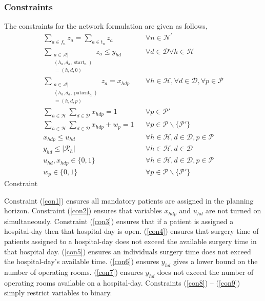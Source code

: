     \subsubsection*{Constraints} The constraints for the network formulation are given as follows,
    \begin{align}
        \sum\limits_{a \in f_n} z_a = \sum\limits_{a \in t_n} z_a 
            && \forall n \in \mathcal{N}^\prime \label{NETcon1:room_flow}\\
        \sum\limits_{\substack{a \in \mathcal{A} | \\ (h_a, d_a, \operatorname{start}_a) \\= (h,d,0)}}z_a \leq y_{hd}
            && \forall d \in \mathcal{D} \forall h \in \mathcal{H}\label{NETcon2:restrict_ops_by_ors}\\
        \sum\limits_{\substack{a \in \mathcal{A} |\\ (h_a,d_a,\operatorname{patient}_a)\\ =(h,d,p)}}z_a= x_{hdp}
            && \forall h \in \mathcal{H}, \forall d \in \mathcal{D}, \forall p \in \mathcal{P}  \label{NETcon3:is_patient_operated_on} \\
        \sum\limits_{h \in \mathcal{H}} \sum\limits_{d \in \mathcal{D}}x_{hdp} = 1 
            && \forall p \in \mathcal{P}' \label{NETcon4:must_do_mandatory}\\
        \sum\limits_{h \in \mathcal{H}} \sum\limits_{d \in \mathcal{D}} x_{hdp} + w_p = 1
            && \forall p \in \mathcal{P} \backslash \{\mathcal{P}'\}\label{NETcon5:turn_on_w}\\
        x_{hdp} \leq u_{hd}
            && \forall h \in \mathcal{H}, d \in \mathcal{D}, p \in \mathcal{P}\label{NETcon5:force_hosp_on}\\
            y_{hd} \leq |\mathcal{R}_h|
            && \forall h\in\mathcal{H}, d \in \mathcal{D} \label{NETcon6:max_OR}\\
            u_{hd}, x_{hdp} \in \{ 0,1\}
            && \forall h\in \mathcal{H}, d \in \mathcal{D}, p \in \mathcal{P}\label{con8}\\
            w_p \in \{0,1\}
            && \forall p \in \mathcal{P} \backslash\{\mathcal{P}'\}\label{con9}
    \end{align}
    Constraint

    Constraint (\ref{con1}) ensures all mandatory patients are assigned in the planning 
    horizon. Constraint (\ref{con2}) ensures that variables $x_{hdp}$ and $u_{hd}$ are not
    turned on simultaneously. Constraint (\ref{con3}) ensures that if a patient is assigned
    a hospital-day then that hospital-day is open. (\ref*{con4}) ensures that surgery time 
    of patients assigned to a hospital-day does not exceed the available surgery time in
    that hospital day. (\ref*{con5}) ensures an individuals surgery time does not exceed 
    the hospital-day's available time. (\ref*{con6}) ensures $y_{hd}$ gives a lower bound 
    on the number of operating rooms. (\ref*{con7}) ensures $y_{hd}$ does not exceed the
    number of operating rooms available on a hospital-day. Constraints (\ref*{con8}) -- (\ref*{con9}) simply restrict
    variables to binary.